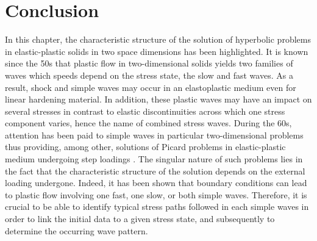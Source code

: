 \section*{Conclusion}

In this chapter, the characteristic structure of the solution of hyperbolic problems in elastic-plastic solids in two space dimensions has been highlighted.
It is known since the 50s that plastic flow in two-dimensional solids yields two families of waves which speeds depend on the stress state, the slow and fast waves.
As a result, shock and simple waves may occur in an elastoplastic medium even for linear hardening material.
In addition, these plastic waves may have an impact on several stresses in contrast to elastic discontinuities across which one stress component varies, hence the name of combined stress waves.
During the 60s, attention has been paid to simple waves in particular two-dimensional problems thus providing, among other, solutions of Picard problems in elastic-plastic medium undergoing step loadings \cite{Clifton,Ting68,Ting73}. %
The singular nature of such problems lies in the fact that the characteristic structure of the solution depends on the external loading undergone.
Indeed, it has been shown \cite{Clifton} that boundary conditions can lead to plastic flow involving one fast, one slow, or both simple waves.
Therefore, it is crucial to be able to identify typical stress paths followed in each simple waves in order to link the initial data to a given stress state, and subsequently to determine the occurring wave pattern.

